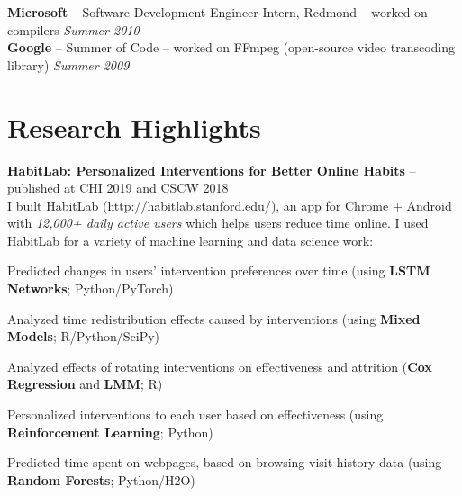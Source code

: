 \documentclass[margin,line]{resume}
\begin{document}
\begin{resume}
\textbf{Microsoft} -- Software Development Engineer Intern, Redmond -- worked on compilers \hfill \textsl{Summer 2010}\\
\textbf{Google} -- Summer of Code -- worked on FFmpeg (open-source video transcoding library) \hfill \textsl{Summer 2009}\\



\vspace{-3mm}

\section{\mysidestyle Research Highlights}



\textbf{HabitLab: Personalized Interventions for Better Online Habits} -- published at CHI 2019 and CSCW 2018\\
I built HabitLab (\url{http://habitlab.stanford.edu/}), an app for Chrome + Android with \emph{12,000+ daily active users} which helps users reduce time online. I used HabitLab for a variety of machine learning and data science work:\\

\vspace{-4mm}

%
\begin{compactitem}
\item Predicted changes in users' intervention preferences over time (using \textbf{LSTM Networks}; Python/PyTorch)
\item Analyzed time redistribution effects caused by interventions (using \textbf{Mixed Models}; R/Python/SciPy)
\item Analyzed effects of rotating interventions on effectiveness and attrition (\textbf{Cox Regression} and \textbf{LMM}; R)
\item Personalized interventions to each user based on effectiveness (using \textbf{Reinforcement Learning}; Python)
\item Predicted time spent on webpages, based on browsing visit history data (using \textbf{Random Forests}; Python/H2O)
\end{compactitem}


\end{resume}
\end{document}
